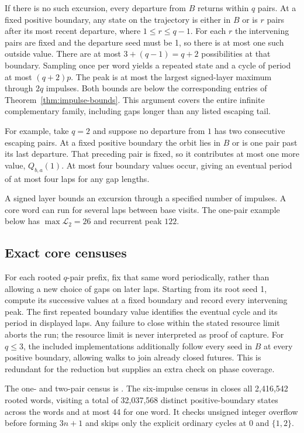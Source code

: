 If there is no such excursion, every departure from $B$ returns within
$q$ pairs. At a fixed positive boundary, any state on the trajectory
is either in $B$ or is $r$ pairs after its most recent departure,
where $1\le r\le q-1$. For each $r$ the intervening pairs are fixed and
the departure seed must be 1, so there is at most one such outside
value. There are at most $3+(q-1)=q+2$ possibilities at that boundary.
Sampling once per word yields a repeated state and a cycle of period
at most $(q+2)p$. The peak is at most the largest signed-layer maximum
through $2q$ impulses. Both bounds are below the corresponding entries
of Theorem~\ref{thm:impulse-bounds}. This argument covers the entire
infinite complementary family, including gaps longer than any listed
escaping tail.

For example, take $q=2$ and suppose no departure from $1$ has two
consecutive escaping pairs. At a fixed positive boundary the orbit lies
in $B$ or is one pair past its last departure. That preceding pair is
fixed, so it contributes at most one more value, $Q_{b,a}(1)$. At most
four boundary values occur, giving an eventual period of at most four
laps for any gap lengths.

A signed layer bounds an excursion through a specified number of impulses.
A core word can run for several laps between base visits. The one-pair
example below has $\max\mathcal L_2=26$ and recurrent peak $122$.

\subsection{Exact core censuses}

For each rooted $q$-pair prefix, fix that same word periodically, rather
than allowing a new choice of gaps on later laps. Starting from its
root seed 1, compute its successive values at a fixed boundary and
record every intervening peak. The first repeated boundary value
identifies the eventual cycle and its period in displayed laps.
Any failure to close within the stated resource limit aborts the run;
the resource limit is never interpreted as proof of capture. For
$q\le3$, the included implementations additionally follow every seed
in $B$ at every positive boundary, allowing walks to join already
closed futures. This is redundant for the reduction but supplies an
extra check on phase coverage.

The one- and two-pair census is
. The six-impulse census in
 closes all
2,416,542 rooted words, visiting a total of 32,037,568 distinct
positive-boundary states across the words and at most 44 for one word.
It checks unsigned integer overflow before forming $3n+1$ and skips
only the explicit ordinary cycles at 0 and $\{1,2\}$.

